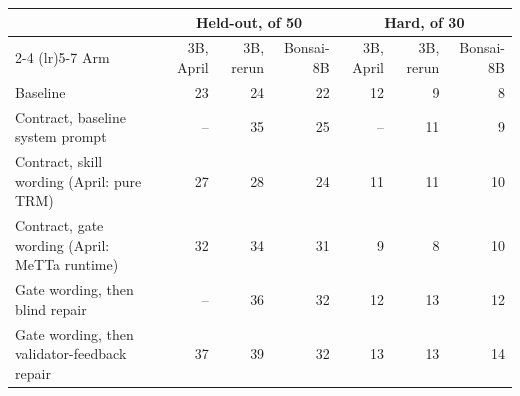 \begin{tabular}{lrrrrrr}
\toprule
 & \multicolumn{3}{c}{Held-out, of 50} & \multicolumn{3}{c}{Hard, of 30} \\
\cmidrule(lr){2-4} \cmidrule(lr){5-7}
Arm & 3B, April & 3B, rerun & Bonsai-8B & 3B, April & 3B, rerun & Bonsai-8B \\
\midrule
Baseline & 23 & 24 & 22 & 12 & 9 & 8 \\
Contract, baseline system prompt & -- & 35 & 25 & -- & 11 & 9 \\
Contract, skill wording (April: pure TRM) & 27 & 28 & 24 & 11 & 11 & 10 \\
Contract, gate wording (April: MeTTa runtime) & 32 & 34 & 31 & 9 & 8 & 10 \\
Gate wording, then blind repair & -- & 36 & 32 & 12 & 13 & 12 \\
Gate wording, then validator-feedback repair & 37 & 39 & 32 & 13 & 13 & 14 \\
\bottomrule
\end{tabular}
